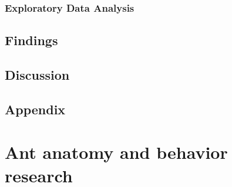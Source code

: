 \documentclass{article}
\begin{document}
	
	
	
	\subsubsection{Exploratory Data Analysis}
	\subsection{Findings}
	\subsection{Discussion}
	\subsection{Appendix}
	
	
	
	\section[section3]{Ant anatomy and behavior research}
	
\end{document}
